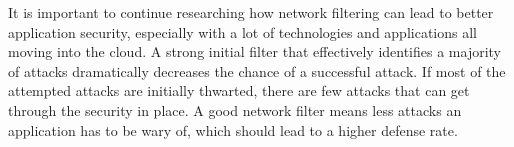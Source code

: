 

It is important to continue researching how network filtering can lead to better application security, especially with a lot of technologies and applications all moving into the cloud.
A strong initial filter that effectively identifies a majority of attacks dramatically decreases the chance of a successful attack. If most of the attempted attacks are initially thwarted,
there are few attacks that can get through the security in place. A good network filter means less attacks an application has to be wary of, which should lead to a higher defense rate.